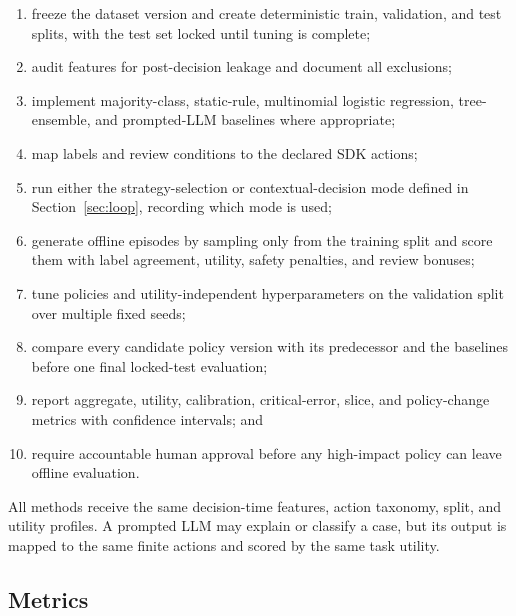 \documentclass[conference]{IEEEtran}
\begin{document}
\begin{enumerate}
\item freeze the dataset version and create deterministic train,
validation, and test splits, with the test set locked until tuning is
complete;
\item audit features for post-decision leakage and document all
exclusions;
\item implement majority-class, static-rule, multinomial logistic
regression, tree-ensemble, and prompted-LLM baselines where
appropriate;
\item map labels and review conditions to the declared SDK actions;
\item run either the strategy-selection or contextual-decision mode
defined in Section~\ref{sec:loop}, recording which mode is used;
\item generate offline episodes by sampling only from the training
split and score them with label agreement, utility, safety penalties,
and review bonuses;
\item tune policies and utility-independent hyperparameters on the
validation split over multiple fixed seeds;
\item compare every candidate policy version with its predecessor and
the baselines before one final locked-test evaluation;
\item report aggregate, utility, calibration, critical-error, slice,
and policy-change metrics with confidence intervals; and
\item require accountable human approval before any high-impact
policy can leave offline evaluation.
\end{enumerate}

All methods receive the same decision-time features, action taxonomy,
split, and utility profiles. A prompted LLM may explain or classify a
case, but its output is mapped to the same finite actions and scored by
the same task utility.

\subsection{Metrics}
\end{document}
